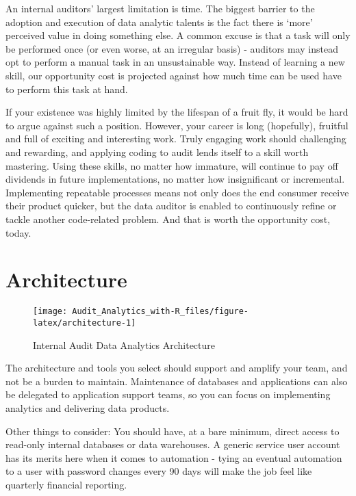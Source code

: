 \documentclass[
]{book}
\begin{document}
An internal auditors' largest limitation is time. The biggest barrier to the adoption and execution of data analytic talents is the fact there is `more' perceived value in doing something else. A common excuse is that a task will only be performed once (or even worse, at an irregular basis) - auditors may instead opt to perform a manual task in an unsustainable way. Instead of learning a new skill, our opportunity cost is projected against how much time can be used have to perform this task at hand.

If your existence was highly limited by the lifespan of a fruit fly, it would be hard to argue against such a position. However, your career is long (hopefully), fruitful and full of exciting and interesting work. Truly engaging work should challenging and rewarding, and applying coding to audit lends itself to a skill worth mastering. Using these skills, no matter how immature, will continue to pay off dividends in future implementations, no matter how insignificant or incremental. Implementing repeatable processes means not only does the end consumer receive their product quicker, but the data auditor is enabled to continuously refine or tackle another code-related problem. And that is worth the opportunity cost, today.

\hypertarget{architecture}{%
\chapter{Architecture}\label{architecture}}

\begin{figure}

{\centering \texttt{[image: Audit\_Analytics\_with-R\_files/figure-latex/architecture-1]} 

}

\caption{Internal Audit Data Analytics Architecture}\label{fig:architecture}
\end{figure}

The architecture and tools you select should support and amplify your team, and not be a burden to maintain. Maintenance of databases and applications can also be delegated to application support teams, so you can focus on implementing analytics and delivering data products.

Other things to consider: You should have, at a bare minimum, direct access to read-only internal databases or data warehouses. A generic service user account has its merits here when it comes to automation - tying an eventual automation to a user with password changes every 90 days will make the job feel like quarterly financial reporting.
\end{document}

